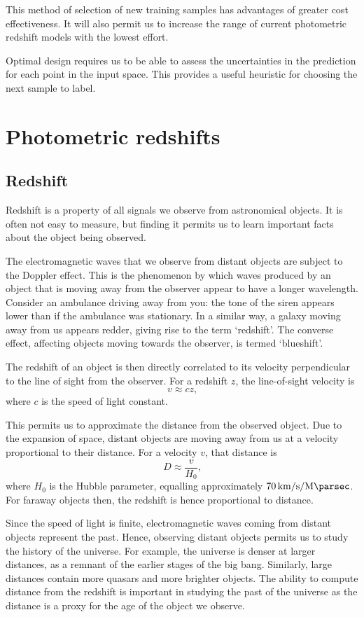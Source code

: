 \documentclass[11pt,twoside]{report}
\begin{document}
This method of selection of new training samples has advantages of greater cost effectiveness. It will also permit us to increase the range of current photometric redshift models with the lowest effort.

Optimal design requires us to be able to assess the uncertainties in the prediction for each point in the input space. This provides a useful heuristic for choosing the next sample to label.


\chapter{Photometric redshifts}

\section{Redshift}
Redshift is a property of all signals we observe from astronomical objects. It is often not easy to measure, but finding it permits us to learn important facts about the object being observed.

The electromagnetic waves that we observe from distant objects are subject to the Doppler effect. This is the phenomenon by which waves produced by an object that is moving away from the observer appear to have a longer wavelength. Consider an ambulance driving away from you: the tone of the siren appears lower than if the ambulance was stationary. In a similar way, a galaxy moving away from us appears redder, giving rise to the term `redshift'. The converse effect, affecting objects moving towards the observer, is termed `blueshift'.

The redshift of an object is then directly correlated to its velocity perpendicular to the line of sight from the observer. For a redshift $z$, the line-of-sight velocity is\[
    v \approx cz \text{,}
\] where $c$ is the speed of light constant.

This permits us to approximate the distance from the observed object. Due to the expansion of space, distant objects are moving away from us at a velocity proportional to their distance. For a velocity $v$, that distance is \[
    D \approx \frac{v}{H_0} \text{,}
\] where $H_0$ is the Hubble parameter, equalling approximately $\SI{70}{\kilo\meter\per\second\per\mega\parsec}$. For faraway objects then, the redshift is hence proportional to distance.

Since the speed of light is finite, electromagnetic waves coming from distant objects represent the past. Hence, observing distant objects permits us to study the history of the universe. For example, the universe is denser at larger distances, as a remnant of the earlier stages of the big bang. Similarly, large distances contain more quasars and more brighter objects. The ability to compute distance from the redshift is important in studying the past of the universe as the distance is a proxy for the age of the object we observe.
\end{document}
